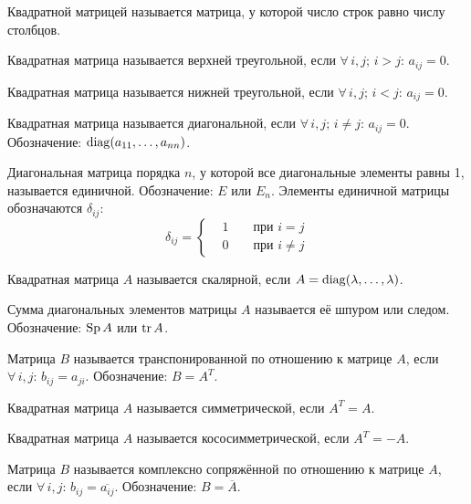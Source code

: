 \documentclass[12pt]{article}
\begin{document}
\begin{definition}
    Квадратной матрицей называется матрица, у которой число строк равно числу столбцов.
\end{definition}
\begin{definition}
    Квадратная матрица называется верхней треугольной, если $\forall\,i,j;\,i>j:\,a_{ij}=0$.
\end{definition}
\begin{definition}
    Квадратная матрица называется нижней треугольной, если $\forall\,i,j;\,i<j:\,a_{ij}=0$.
\end{definition}
\begin{definition}
    Квадратная матрица называется диагональной, если $\forall\,i,j;\,i\neq j:\,a_{ij}=0$. Обозначение: $\operatorname{diag}(a_{11},\ldots,a_{nn})$.
\end{definition}
\begin{definition}
    Диагональная матрица порядка $n$, у которой все диагональные элементы равны 1, называется единичной. Обозначение: $E$ или $E_n$. Элементы единичной матрицы обозначаются $\delta_{ij}$:
    $$\delta_{ij}=\left\{\begin{alignedat}{2}
        & 1 && \text{ при }i=j \\
        & 0  && \text{ при }i\neq j
      \end{alignedat}\right.$$
\end{definition}
\begin{definition}
    Квадратная матрица $A$ называется скалярной, если $A=\operatorname{diag}(\lambda,\ldots,\lambda)$.
\end{definition}
\begin{definition}
    Сумма диагональных элементов матрицы $A$ называется её шпуром или следом. Обозначение: $\operatorname{Sp} A$ или $\operatorname{tr} A$.
\end{definition}
\begin{definition}
    Матрица $B$ называется транспонированной по отношению к матрице $A$, если $\forall\,i,j:\,b_{ij}=a_{ji}$. Обозначение: $B=A^T$.
\end{definition}
\begin{definition}
    Квадратная матрица $A$ называется симметрической, если $A^T=A$.
\end{definition}
\begin{definition}
    Квадратная матрица $A$ называется кососимметрической, если $A^T=-A$.
\end{definition}
\begin{definition}
    Матрица $B$ называется комплексно сопряжённой по отношению к матрице $A$, если $\forall\,i,j:\,b_{ij}=\overline{a_{ij}}$. Обозначение: $B=\overline{A}$.
\end{definition}
\end{document}
